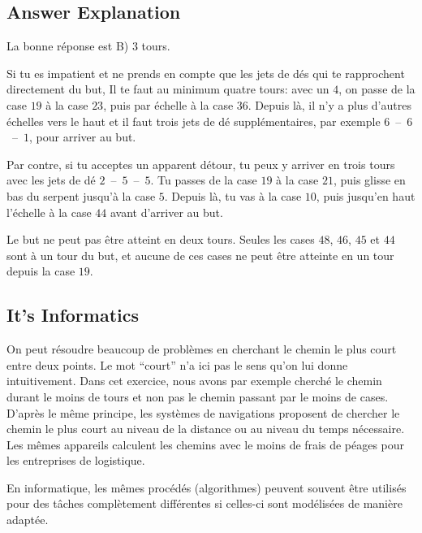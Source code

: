 \documentclass[a4paper,11pt]{report}
\newcommand{\taskGraphicsFolder}{..}
\begin{document}
\endgroup

\subsection*{Answer Explanation}

La bonne réponse est B) $3$ tours.

Si tu es impatient et ne prends en compte que les jets de dés qui te rapprochent directement du but, Il te faut au minimum quatre tours: avec un $4$, on passe de la case $19$ à la case $23$, puis par échelle à la case $36$. Depuis là, il n’y a plus d’autres échelles vers le haut et il faut trois jets de dé supplémentaires, par exemple $6$~–~$6$~–~$1$, pour arriver au but.

{\centering%
\par}

Par contre, si tu acceptes un apparent détour, tu peux y arriver en trois tours avec les jets de dé $2$~–~$5$~–~$5$. Tu passes de la case $19$ à la case $21$, puis glisse en bas du serpent jusqu’à la case $5$. Depuis là, tu vas à la case $10$, puis jusqu’en haut l’échelle à la case $44$ avant d’arriver au but.

{\centering%
\par}

Le but ne peut pas être atteint en deux tours. Seules les cases $48$, $46$, $45$ et $44$ sont à un tour du but, et aucune de ces cases ne peut être atteinte en un tour depuis la case $19$.


\subsection*{It’s Informatics}

On peut résoudre beaucoup de problèmes en cherchant le chemin le plus court entre deux points. Le mot “court” n’a ici pas le sens qu’on lui donne intuitivement. Dans cet exercice, nous avons par exemple cherché le chemin durant le moins de tours et non pas le chemin passant par le moins de cases. D’après le même principe, les systèmes de navigations proposent de chercher le chemin le plus court au niveau de la distance ou au niveau du temps nécessaire. Les mêmes appareils calculent les chemins avec le moins de frais de péages pour les entreprises de logistique.

En informatique, les mêmes procédés (algorithmes) peuvent souvent être utilisés pour des tâches complètement différentes si celles-ci sont modélisées de manière adaptée.
\end{document}
